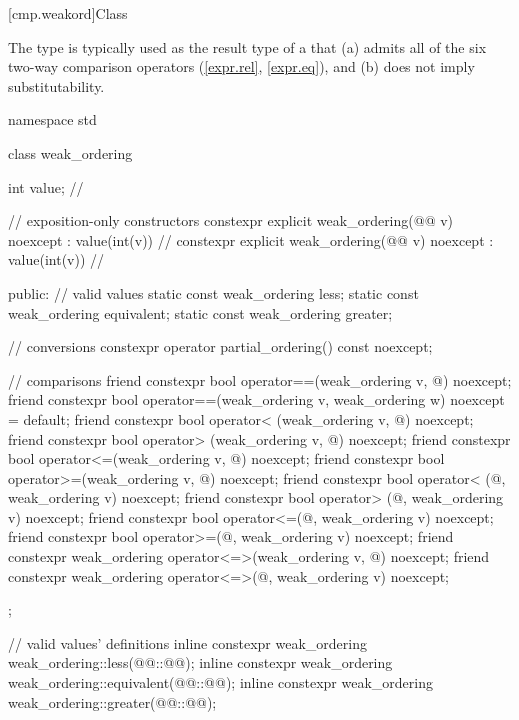 [cmp.weakord]{Class }

\pnum
The  type is typically used
as the result type of a 
that (a) admits all of the six two-way comparison operators (\ref{expr.rel}, \ref{expr.eq}),
and (b) does not imply substitutability.

%
%
%
%
\begin{codeblock}
namespace std {
  class weak_ordering {
    int value;  // \expos

    // exposition-only constructors
    constexpr explicit weak_ordering(@@ v) noexcept : value(int(v)) {}  // \expos
    constexpr explicit weak_ordering(@@ v) noexcept : value(int(v)) {} // \expos

  public:
    // valid values
    static const weak_ordering less;
    static const weak_ordering equivalent;
    static const weak_ordering greater;

    // conversions
    constexpr operator partial_ordering() const noexcept;

    // comparisons
    friend constexpr bool operator==(weak_ordering v, @\unspec@) noexcept;
    friend constexpr bool operator==(weak_ordering v, weak_ordering w) noexcept = default;
    friend constexpr bool operator< (weak_ordering v, @\unspec@) noexcept;
    friend constexpr bool operator> (weak_ordering v, @\unspec@) noexcept;
    friend constexpr bool operator<=(weak_ordering v, @\unspec@) noexcept;
    friend constexpr bool operator>=(weak_ordering v, @\unspec@) noexcept;
    friend constexpr bool operator< (@\unspec@, weak_ordering v) noexcept;
    friend constexpr bool operator> (@\unspec@, weak_ordering v) noexcept;
    friend constexpr bool operator<=(@\unspec@, weak_ordering v) noexcept;
    friend constexpr bool operator>=(@\unspec@, weak_ordering v) noexcept;
    friend constexpr weak_ordering operator<=>(weak_ordering v, @\unspec@) noexcept;
    friend constexpr weak_ordering operator<=>(@\unspec@, weak_ordering v) noexcept;
  };

  // valid values' definitions
  inline constexpr weak_ordering weak_ordering::less(@@::@@);
  inline constexpr weak_ordering weak_ordering::equivalent(@@::@@);
  inline constexpr weak_ordering weak_ordering::greater(@@::@@);
}
\end{codeblock}

